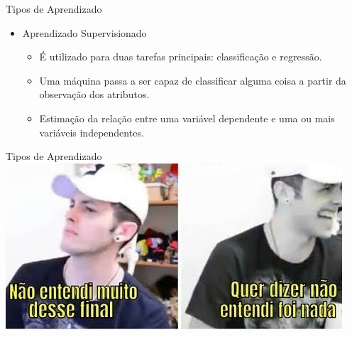 \documentclass{libs/ufc_format}
\begin{document}
\begin{frame}{Tipos de Aprendizado}
    \begin{itemize}
        \item Aprendizado Supervisionado
            \begin{itemize}
                \justifying
                \item É utilizado para duas tarefas principais: \alert<2>{classificação} e \alert<3>{regressão}.
                \item<2> Uma máquina passa a ser capaz de classificar alguma coisa a partir da observação dos atributos.
                \item<3> Estimação da relação entre uma variável dependente e uma ou mais variáveis independentes.
            \end{itemize}
    \end{itemize}
\end{frame}

\begin{frame}{Tipos de Aprendizado}
    \centering
    \includegraphics[width=\textwidth]{memes/entendi_nada}
\end{frame}

\end{document}
